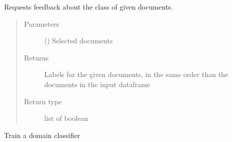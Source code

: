 \documentclass[letterpaper,10pt,english]{sphinxmanual}
\begin{document}
\begin{fulllineitems}
\begin{fulllineitems}
\end{fulllineitems}


\begin{fulllineitems}
\label{\detokenize{dc_task_manager:src.task_manager.TaskManagerCMD.get_labels_from_docs}}
\sphinxAtStartPar
Requests feedback about the class of given documents.
\begin{quote}\begin{description}
\item[{Parameters}] \leavevmode
\sphinxAtStartPar
{} () \textendash{} Selected documents

\item[{Returns}] \leavevmode
\sphinxAtStartPar
{} \textendash{} Labels for the given documents, in the same order than the
documents in the input dataframe

\item[{Return type}] \leavevmode
\sphinxAtStartPar
list of boolean

\end{description}\end{quote}

\end{fulllineitems}


\begin{fulllineitems}
\label{\detokenize{dc_task_manager:src.task_manager.TaskManagerCMD.train_PUmodel}}
\sphinxAtStartPar
Train a domain classifier

\end{fulllineitems}


\end{fulllineitems}

\end{document}
